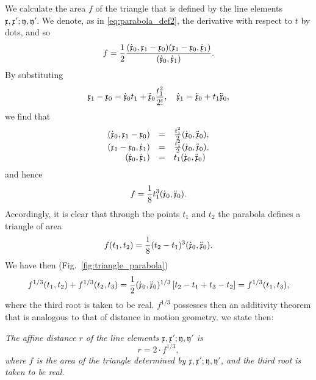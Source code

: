 \documentclass[11pt]{book} \usepackage{amssymb}
\newcommand{\myvec}[1]{\mathfrak{#1}}
\begin{document}
We calculate the area $f$ of the triangle that is defined by the line elements
$\myvec{x},\myvec{x}';\myvec{y},\myvec{y}'$. We denote, as in 
\eqref{eq:parabola_def2}, the derivative with respect to $t$ by dots,
and so
\begin{equation}
  \label{eq:triangle_area_vector}
  f={1\over 2}{(\dot{\myvec{x}}_0,\myvec{x}_1-\myvec{x}_0)(\myvec{x}_1-\myvec{x}_0,\dot{\myvec{x}}_1)
    \over (\dot{\myvec{x}}_0,\dot{\myvec{x}}_1)}.
\end{equation}
By substituting 
\begin{equation*} 
  \myvec{x}_1-\myvec{x}_0=\dot{\myvec{x}}_0t_1+\ddot{\myvec{x}}_0{t_1^2\over 2!},\quad \dot{\myvec{x}}_1=\dot{\myvec{x}}_0+t_1\ddot{\myvec{x}}_0,
\end{equation*}
we find that
\begin{equation*}
  \begin{array}{rcl}
    (\dot{\myvec{x}}_0,\myvec{x}_1-\myvec{x}_0)&=&{t_1^2\over 2}(\dot{\myvec{x}}_0,\ddot{\myvec{x}}_0),\\
    (\myvec{x}_1-\myvec{x}_0,\dot{\myvec{x}}_1)&=&{t_1^2\over 2}(\dot{\myvec{x}}_0,\ddot{\myvec{x}}_0),\\
    (\dot{\myvec{x}}_0,\dot{\myvec{x}}_1)&=&t_1(\dot{\myvec{x}}_0,\ddot{\myvec{x}}_0)
  \end{array}
\end{equation*}
and hence
\begin{equation}
  \label{eq:triangle_area_parabola}
  f={1\over 8}t_1^3(\dot{\myvec{x}}_0,\ddot{\myvec{x}}_0).
\end{equation}
Accordingly, it is clear that through the points $t_1$ and $t_2$ the parabola
defines a triangle of area
\begin{equation}
  \label{eq:parabola_defines_area}
  f(t_1,t_2)={1\over 8}(t_2-t_1)^3(\dot{\myvec{x}}_0,\ddot{\myvec{x}}_0).
\end{equation}
We have then (Fig.~\ref{fig:triangle_parabola})
\begin{equation}
  \label{eq:affine_distance_additive}
  f^{1/3}(t_1,t_2)+f^{1/3}(t_2,t_3)={1\over 2}(\dot{\myvec{x}}_0,\ddot{\myvec{x}}_0)^{1/3}\left[t_2-t_1+t_3-t_2\right]=f^{1/3}(t_1,t_3),
\end{equation}
where the third root is taken to be real. $f^{1/3}$ possesses then an 
additivity theorem that is analogous to that of distance in motion geometry. we
state then:

{\em The affine distance $r$ of the line elements 
$\myvec{x},\myvec{x}';\myvec{y},\myvec{y}'$ is 
$$r=2\cdot f^{1/3},$$
where $f$ is the area of the triangle determined by 
$\myvec{x},\myvec{x}';\myvec{y},\myvec{y}'$, and the third root is taken to be
real.}
\end{document}

